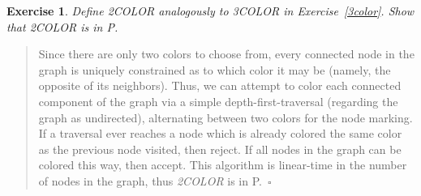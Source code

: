 \documentclass{article}
\theoremstyle{break}			%
\newtheorem{exercise}{Exercise}
\theoremstyle{plain}
\newenvironment{answer}{\begin{quotation}\noindent}{\end{quotation}}
\renewcommand{\qed}{~\ensuremath{\square}}
\newcommand{\setname}[1]{\textit{#1}}
\begin{document}
\begin{exercise}
Define \setname{2COLOR} analogously to \setname{3COLOR} in
Exercise~\ref{3color}.  Show that \setname{2COLOR} is in P.
\end{exercise}
\begin{answer}
Since there are only two colors to choose from, every connected node
in the graph is uniquely constrained as to which color it may be
(namely, the opposite of its neighbors).  Thus, we can attempt to
color each connected component of the graph via a simple
depth-first-traversal (regarding the graph as undirected), alternating
between two colors for the node marking.  If a traversal ever reaches
a node which is already colored the same color as the previous node
visited, then reject.  If all nodes in the graph can be colored this
way, then accept.  This algorithm is linear-time in the number of
nodes in the graph, thus \setname{2COLOR} is in P.\qed
\end{answer}
\end{document}
